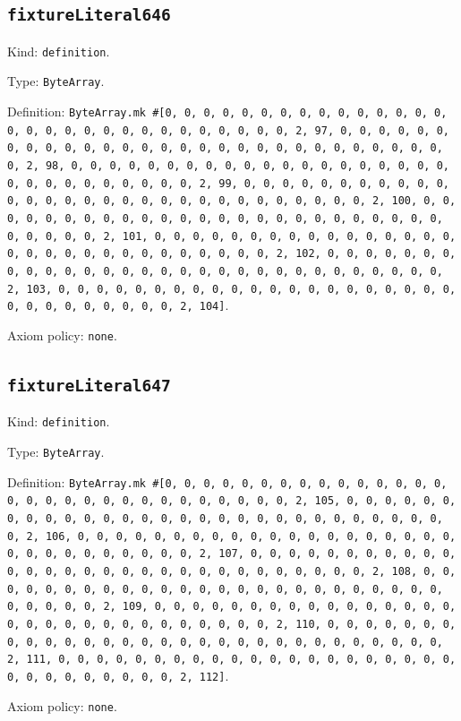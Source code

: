 \documentclass[11pt]{article}
\begin{document}
\subsection*{\texttt{fixtureLiteral646}}
\noindent Kind: \texttt{definition}.\par
\noindent Type: \texttt{ByteArray}.\par
\noindent Definition: \texttt{ByteArray.mk \#[0, 0, 0, 0, 0, 0, 0, 0, 0, 0, 0, 0, 0, 0, 0, 0, 0, 0, 0, 0, 0, 0, 0, 0, 0, 0, 0, 0, 0, 0, 2, 97, 0, 0, 0, 0, 0, 0, 0, 0, 0, 0, 0, 0, 0, 0, 0, 0, 0, 0, 0, 0, 0, 0, 0, 0, 0, 0, 0, 0, 0, 0, 2, 98, 0, 0, 0, 0, 0, 0, 0, 0, 0, 0, 0, 0, 0, 0, 0, 0, 0, 0, 0, 0, 0, 0, 0, 0, 0, 0, 0, 0, 0, 0, 2, 99, 0, 0, 0, 0, 0, 0, 0, 0, 0, 0, 0, 0, 0, 0, 0, 0, 0, 0, 0, 0, 0, 0, 0, 0, 0, 0, 0, 0, 0, 0, 2, 100, 0, 0, 0, 0, 0, 0, 0, 0, 0, 0, 0, 0, 0, 0, 0, 0, 0, 0, 0, 0, 0, 0, 0, 0, 0, 0, 0, 0, 0, 0, 2, 101, 0, 0, 0, 0, 0, 0, 0, 0, 0, 0, 0, 0, 0, 0, 0, 0, 0, 0, 0, 0, 0, 0, 0, 0, 0, 0, 0, 0, 0, 0, 2, 102, 0, 0, 0, 0, 0, 0, 0, 0, 0, 0, 0, 0, 0, 0, 0, 0, 0, 0, 0, 0, 0, 0, 0, 0, 0, 0, 0, 0, 0, 0, 2, 103, 0, 0, 0, 0, 0, 0, 0, 0, 0, 0, 0, 0, 0, 0, 0, 0, 0, 0, 0, 0, 0, 0, 0, 0, 0, 0, 0, 0, 0, 0, 2, 104]}.\par
\noindent Axiom policy: \texttt{none}.\par
\subsection*{\texttt{fixtureLiteral647}}
\noindent Kind: \texttt{definition}.\par
\noindent Type: \texttt{ByteArray}.\par
\noindent Definition: \texttt{ByteArray.mk \#[0, 0, 0, 0, 0, 0, 0, 0, 0, 0, 0, 0, 0, 0, 0, 0, 0, 0, 0, 0, 0, 0, 0, 0, 0, 0, 0, 0, 0, 0, 2, 105, 0, 0, 0, 0, 0, 0, 0, 0, 0, 0, 0, 0, 0, 0, 0, 0, 0, 0, 0, 0, 0, 0, 0, 0, 0, 0, 0, 0, 0, 0, 2, 106, 0, 0, 0, 0, 0, 0, 0, 0, 0, 0, 0, 0, 0, 0, 0, 0, 0, 0, 0, 0, 0, 0, 0, 0, 0, 0, 0, 0, 0, 0, 2, 107, 0, 0, 0, 0, 0, 0, 0, 0, 0, 0, 0, 0, 0, 0, 0, 0, 0, 0, 0, 0, 0, 0, 0, 0, 0, 0, 0, 0, 0, 0, 2, 108, 0, 0, 0, 0, 0, 0, 0, 0, 0, 0, 0, 0, 0, 0, 0, 0, 0, 0, 0, 0, 0, 0, 0, 0, 0, 0, 0, 0, 0, 0, 2, 109, 0, 0, 0, 0, 0, 0, 0, 0, 0, 0, 0, 0, 0, 0, 0, 0, 0, 0, 0, 0, 0, 0, 0, 0, 0, 0, 0, 0, 0, 0, 2, 110, 0, 0, 0, 0, 0, 0, 0, 0, 0, 0, 0, 0, 0, 0, 0, 0, 0, 0, 0, 0, 0, 0, 0, 0, 0, 0, 0, 0, 0, 0, 2, 111, 0, 0, 0, 0, 0, 0, 0, 0, 0, 0, 0, 0, 0, 0, 0, 0, 0, 0, 0, 0, 0, 0, 0, 0, 0, 0, 0, 0, 0, 0, 2, 112]}.\par
\noindent Axiom policy: \texttt{none}.\par
\end{document}

